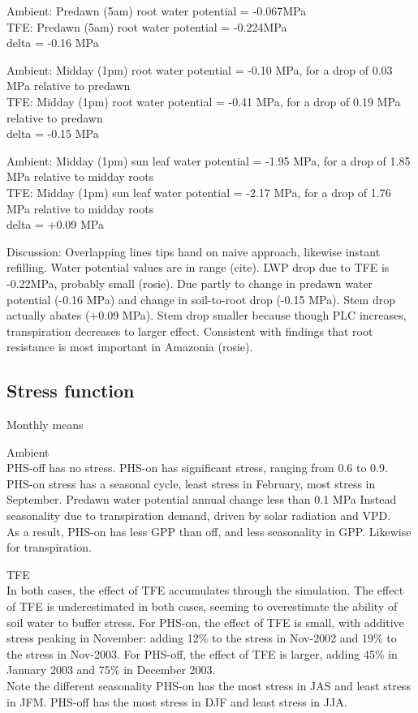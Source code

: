 \documentclass[draft,linenumbers]{agujournal}
\begin{document}
Ambient: Predawn (5am) root water potential = -0.067MPa \\
TFE: Predawn (5am) root water potential = -0.224MPa \\
delta = -0.16 MPa

Ambient: Midday (1pm) root water potential = -0.10 MPa, for a drop of 0.03 MPa relative to predawn \\
TFE: Midday (1pm) root water potential = -0.41 MPa, for a drop of 0.19 MPa relative to predawn \\
delta = -0.15 MPa

Ambient: Midday (1pm) sun leaf water potential = -1.95 MPa, for a drop of 1.85 MPa relative to midday roots \\
TFE: Midday (1pm) sun leaf water potential = -2.17 MPa, for a drop of 1.76 MPa relative to midday roots \\
delta = +0.09 MPa

Discussion:
Overlapping lines tips hand on naive approach, likewise instant refilling.
Water potential values are in range (cite).
LWP drop due to TFE is -0.22MPa, probably small (rosie).
Due partly to change in predawn water potential (-0.16 MPa) and change in soil-to-root drop (-0.15 MPa). 
Stem drop actually abates (+0.09 MPa).
Stem drop smaller because though PLC increases, transpiration decreases to larger effect.
Consistent with findings that root resistance is most important in Amazonia (rosie).

\subsection{Stress function}

Monthly means

Ambient \\
PHS-off has no stress. PHS-on has significant stress, ranging from 0.6 to 0.9.
PHS-on stress has a seasonal cycle, least stress in February, most stress in September.
Predawn water potential annual change less than 0.1 MPa
Instead seasonality due to transpiration demand, driven by solar radiation and VPD. \\
As a result, PHS-on has less GPP than off, and less seasonality in GPP. Likewise for transpiration.

TFE \\
In both cases, the effect of TFE accumulates through the simulation. 
The effect of TFE is underestimated in both cases, seeming to overestimate the ability of soil water to buffer stress.
For PHS-on, the effect of TFE is small, with additive stress peaking in November: adding 12\% to the stress in Nov-2002 and 19\% to the stress in Nov-2003.
For PHS-off, the effect of TFE is larger, adding 45\% in January 2003  and 75\% in December 2003. \\
Note the different seasonality
PHS-on has the most stress in JAS and least stress in JFM. 
PHS-off has the most stress in DJF and least stress in JJA. \\
\end{document}
